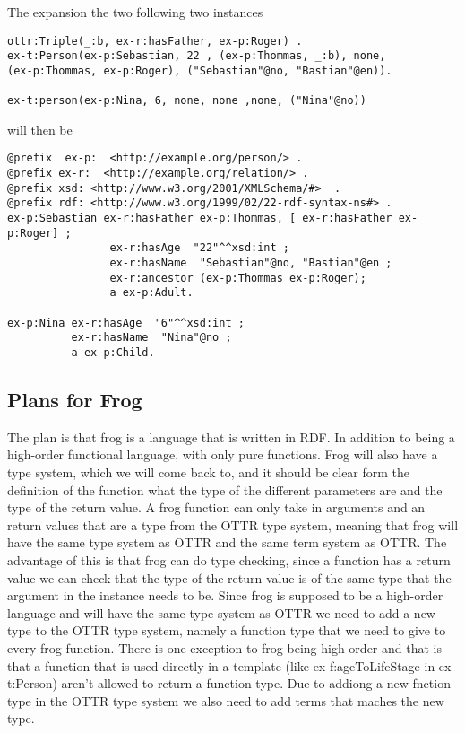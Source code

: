 The expansion the two following two instances

\begin{lstlisting}[frame=single]
ottr:Triple(_:b, ex-r:hasFather, ex-p:Roger) .
ex-t:Person(ex-p:Sebastian, 22 , (ex-p:Thommas, _:b), none, 
(ex-p:Thommas, ex-p:Roger), ("Sebastian"@no, "Bastian"@en)).

ex-t:person(ex-p:Nina, 6, none, none ,none, ("Nina"@no))
\end{lstlisting}

will then be
\begin{lstlisting}[frame=single, language=turtle]
@prefix  ex-p:  <http://example.org/person/> . 
@prefix ex-r:  <http://example.org/relation/> . 
@prefix xsd: <http://www.w3.org/2001/XMLSchema/#>  . 
@prefix rdf: <http://www.w3.org/1999/02/22-rdf-syntax-ns#> .
ex-p:Sebastian ex-r:hasFather ex-p:Thommas, [ ex-r:hasFather ex-p:Roger] ; 
                ex-r:hasAge  "22"^^xsd:int ; 
                ex-r:hasName  "Sebastian"@no, "Bastian"@en ;
                ex-r:ancestor (ex-p:Thommas ex-p:Roger);
                a ex-p:Adult.

ex-p:Nina ex-r:hasAge  "6"^^xsd:int ; 
          ex-r:hasName  "Nina"@no ;
          a ex-p:Child.
\end{lstlisting}

\subsection{Plans for Frog}
The plan is that frog is a language that is written in RDF. In addition to being a high-order functional language, 
with only pure functions. 
Frog will also have a type system, which we will come back to, and it should be clear form the definition of 
the function what the type of the different parameters are and the type of the return value. 
A frog function can only take in arguments and an return values that are a type from the OTTR type system, 
meaning that frog will have the same type system as OTTR and the same term system as OTTR.
The advantage of this is that frog can do type checking, since a function has a return value we can check that 
the type of the return value is of the same type that the argument in the instance needs to be.
Since frog is supposed to be a high-order language and will have the same type system as OTTR  
we need to add a new type to the OTTR type system, namely a function type that we need to give to every frog function. 
There is one exception to frog being high-order and that is that a function that is used directly in a 
template (like ex-f:ageToLifeStage in ex-t:Person) aren't allowed to return a function type. Due to addiong a new 
fnction type in the OTTR type system we also need to add terms that maches the new type. 

